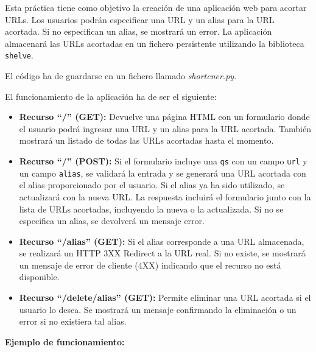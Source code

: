 Esta práctica tiene como objetivo la creación de una aplicación web para acortar URLs. Los usuarios podrán especificar una URL y un alias para la URL acortada. Si no especifican un alias, se mostrará un error. La aplicación almacenará las URLs acortadas en un fichero persistente utilizando la biblioteca \texttt{shelve}.

El código ha de guardarse en un fichero llamado \emph{shortener.py}.

El funcionamiento de la aplicación ha de ser el siguiente:

\begin{itemize}
    \item \textbf{Recurso ``/'' (GET):} Devuelve una página HTML con un formulario donde el usuario podrá ingresar una URL y un alias para la URL acortada. También mostrará un listado de todas las URLs acortadas hasta el momento.
    
    \item \textbf{Recurso ``/'' (POST):} Si el formulario incluye una \texttt{qs} con un campo \texttt{url} y un campo \texttt{alias}, se validará la entrada y se generará una URL acortada con el alias proporcionado por el usuario. Si el alias ya ha sido utilizado, se actualizará con la nueva URL. La respuesta incluirá el formulario junto con la lista de URLs acortadas, incluyendo la nueva o la actualizada. Si no se especifica un alias, se devolverá un mensaje error.
    
    \item \textbf{Recurso ``/alias'' (GET):} Si el alias corresponde a una URL almacenada, se realizará un HTTP 3XX Redirect a la URL real. Si no existe, se mostrará un mensaje de error de cliente (4XX) indicando que el recurso no está disponible.
    
    \item \textbf{Recurso ``/delete/alias'' (GET):} Permite eliminar una URL acortada si el usuario lo desea. Se mostrará un mensaje confirmando la eliminación o un error si no existiera tal alias.
\end{itemize}

\textbf{Ejemplo de funcionamiento:}


